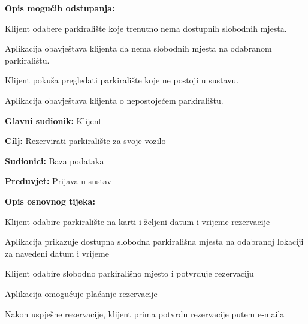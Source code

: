 {\begin{packed_item}
\begin{packed_enum}
	\end{packed_enum}
	
	\item  \textbf{Opis mogućih odstupanja:}
	
	\item[] \begin{packed_item}
		
		\item[2.a] Klijent odabere parkiralište koje trenutno nema dostupnih slobodnih mjesta.
		\item[] \begin{packed_enum}
			
			\item Aplikacija obavještava klijenta da nema slobodnih mjesta na odabranom parkiralištu.
			
		\end{packed_enum}
		\item[2.b] Klijent pokuša pregledati parkiralište koje ne postoji u sustavu.
		\item[] \begin{packed_enum}
			
			\item Aplikacija obavještava klijenta o nepostojećem parkiralištu.
			
		\end{packed_enum}
		
	\end{packed_item}
	
\end{packed_item}

\noindent {}
\begin{packed_item}
	
	\item \textbf{Glavni sudionik: }Klijent
	\item  \textbf{Cilj:} Rezervirati parkiralište za svoje vozilo
	\item  \textbf{Sudionici:} Baza podataka
	\item  \textbf{Preduvjet:} Prijava u sustav
	\item  \textbf{Opis osnovnog tijeka:}
	
	\item[] \begin{packed_enum}
		
		\item Klijent odabire parkiralište na karti i željeni datum i vrijeme rezervacije
		\item Aplikacija prikazuje dostupna slobodna parkirališna mjesta na odabranoj lokaciji za navedeni datum i vrijeme
		\item Klijent odabire slobodno parkirališno mjesto i potvrđuje rezervaciju
		\item Aplikacija omogućuje plaćanje rezervacije
		\item Nakon uspješne rezervacije, klijent prima potvrdu rezervacije putem e-maila
		

\end{packed_enum}
\end{packed_item}}
